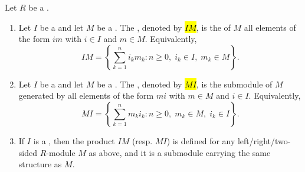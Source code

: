\begin{definition} \label{definition:product_of_a_module_by_an_ideal_of_a_ring}
    Let $R$ be a .

    \begin{enumerate}
        \item Let $I$ be a  and let $M$ be a . The , denoted by \hl{$IM$}, is the  of $M$  all elements of the form $im$ with $i \in I$ and $m \in M$. Equivalently,
        $$IM = \left\{ \sum_{k=1}^n i_k m_k : n \ge 0, \; i_k \in I, \; m_k \in M \right\}.$$

        \item Let $I$ be a  and let $M$ be a . The , denoted by \hl{$MI$}, is the submodule of $M$ generated by all elements of the form $mi$ with $m \in M$ and $i \in I$. Equivalently,
        $$MI = \left\{ \sum_{k=1}^n m_k i_k : n \ge 0, \; m_k \in M, \; i_k \in I \right\}.$$

        \item If $I$ is a , then the product $IM$ (resp. $MI$) is defined for any left/right/two-sided $R$-module $M$ as above, and it is a submodule carrying the same structure as $M$.
    \end{enumerate}
\end{definition}